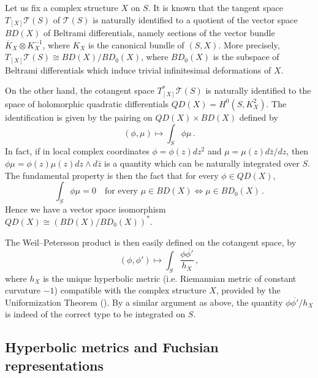 \documentclass[11pt]{article}
\theoremstyle{definition}
\numberwithin{equation}{section}
\numberwithin{figure}{section}
\numberwithin{table}{section}
\newcommand{\Teich}{\mathcal{T}}
\begin{document}
Let us fix a complex structure $X$ on $S$. It is known that the tangent space $T_{[X]}\Teich(S)$ of $\Teich(S)$ is naturally identified to a quotient of the vector space $BD(X)$ of Beltrami differentials, namely sections of the vector bundle $\overline K_X\otimes K_X^{-1}$, where $K_X$ is the canonical bundle of $(S,X)$. More precisely, $T_{[X]}\Teich(S)\cong BD(X)/BD_0(X)$, where $BD_0(X)$ is the subspace of Beltrami differentials which induce trivial infinitesimal deformations of $X$.

On the other hand, the cotangent space $T^*_{[X]}\Teich(S)$ is naturally identified to the space of holomorphic quadratic differentials $QD(X)=H^0(S,K_X^2)$. The identification is given by the pairing on $QD(X)\times BD(X)$ defined by
\[
(\phi,\mu)\mapsto\int_S \phi\mu\,.
\]
In fact, if in local complex coordinates $\phi=\phi(z)dz^2$ and $\mu=\mu(z)d\bar z/dz$, then $\phi\mu=\phi(z)\mu(z)dz\wedge d\bar z$ is a quantity which can be naturally integrated over $S$. The fundamental property is then the fact that for every $\phi\in QD(X)$,
\[
\int_S \phi\mu=0\quad\text{for every }\mu\in BD(X)\Leftrightarrow \mu\in BD_0(X)\,.
\]
Hence we have a vector space isomorphism $QD(X)\cong (BD(X)/BD_0(X))^*$.

The Weil--Petersson product is then easily defined on the cotangent space, by
\[
(\phi,\phi')\mapsto \int_S \frac{\phi\overline{\phi'}}{h_X}\,,
\]
where $h_X$ is the unique hyperbolic metric (i.e. Riemannian metric of constant curvature $-1$) compatible with the complex structure $X$, provided by the Uniformization Theorem (\cite{koebeunif}). By a similar argument as above, the quantity $\phi\overline{\phi'}/h_X$ is indeed of the correct type to be integrated on $S$.



\subsection*{Hyperbolic metrics and Fuchsian representations}
\end{document}
